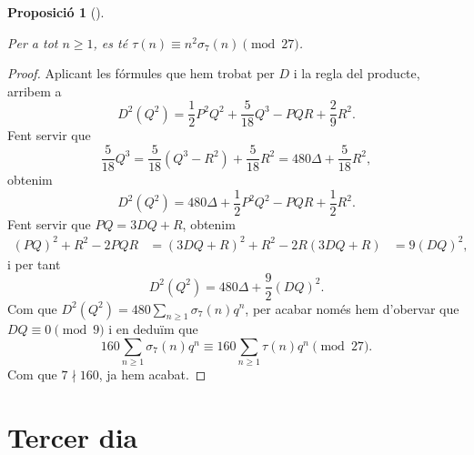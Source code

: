 \documentclass[
  letterpaper,
  DIV=11,
  numbers=noendperiod]{scrreprt}
\theoremstyle{plain}
\theoremstyle{plain}
\theoremstyle{definition}
\theoremstyle{plain}
\newtheorem{proposition}{Proposició}[chapter]
\theoremstyle{plain}
\theoremstyle{definition}
\theoremstyle{remark}
\begin{document}
\begin{proposition}[]\protect\hypertarget{prp-}{}\label{prp-}

Per a tot \(n\geq 1\), es té \(\tau(n) \equiv n^2\sigma_7(n)\pmod{27}\).

\end{proposition}

\begin{proof}
Aplicant les fórmules que hem trobat per \(D\) i la regla del producte,
arribem a \[
D^2(Q^2) = \frac{1}{2}P^2Q^2 +\frac{5}{18}Q^3 -PQR +\frac{2}{9}R^2.
\] Fent servir que \[
\frac{5}{18}Q^3 = \frac{5}{18}(Q^3-R^2) +\frac{5}{18}R^2 = 480\Delta+\frac{5}{18}R^2,
\] obtenim \[
D^2(Q^2) = 480\Delta +\frac{1}{2} P^2Q^2 - PQR+\frac{1}{2}R^2.
\] Fent servir que \(PQ=3DQ+R\), obtenim \begin{align*}
(PQ)^2 +R^2-2PQR &= (3DQ+R)^2+R^2-2R(3DQ+R)
&= 9(DQ)^2,
\end{align*} i per tant \[
D^2(Q^2)=480\Delta + \frac{9}{2} (DQ)^2.
\] Com que \(D^2(Q^2) = 480\sum_{n\geq 1}\sigma_7(n)q^n\), per acabar
només hem d'obervar que \(DQ\equiv 0\pmod{9}\) i en deduïm que \[
160\sum_{n\geq 1}\sigma_7(n)q^n \equiv 160\sum_{n\geq 1}\tau(n)q^n \pmod{27}.
\] Com que \(7\nmid 160\), ja hem acabat.
\end{proof}


\chapter{Tercer dia}\label{tercer-dia}

\providecommand{\QQ}{\mathbb{Q}}
\providecommand{\ZZ}{\mathbb{Z}}
\providecommand{\RR}{\mathbb{R}}
\providecommand{\FF}{\mathbb{F}}
\providecommand{\CC}{\mathbb{C}}
\providecommand{\HH}{\mathbb{H}}

\providecommand{\fX}{\mathfrak{X}}

\providecommand{\SL}{\operatorname{SL}}
\providecommand{\GL}{\operatorname{GL}}
\providecommand{\PSL}{\operatorname{PSL}}
\providecommand{\PGL}{\operatorname{PGL}}

\providecommand{\lto}{\longrightarrow}
\providecommand{\dfn}{\ensuremath{:=}}
\providecommand{\surjects}{\twoheadrightarrow}
\providecommand{\injects}{\hookrightarrow}
\providecommand{\id}{\ensuremath \text{Id}}
\providecommand{\tns}[1][]{\otimes_{\!#1}}
\providecommand{\mtx}[4]{\left(\begin{matrix}#1&#2\\#3&#4\end{matrix}\right)}
\providecommand{\mat}[1]{\left(\begin{matrix}#1\end{matrix}\right)}
\providecommand{\smat}[1]{\left(\begin{smallmatrix}#1\end{smallmatrix}\right)}
\providecommand{\smtx}[4]{\left(\begin{smallmatrix}#1&#2\\#3&#4\end{smallmatrix}\right)}
\end{document}

